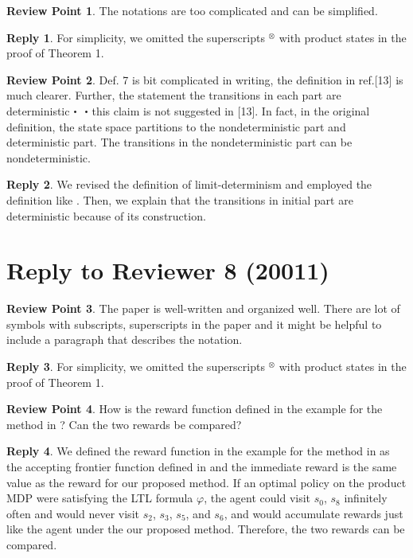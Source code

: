 \documentclass[10 pt, dvipdfmx]{article}
\theoremstyle{definition}
\newtheorem{review point}{Review Point}[section]
\newtheorem*{reply}{Reply}
\begin{document}
\begin{review point}
  The notations are too complicated and can be simplified.
\end{review point}

\begin{reply}
  For simplicity, we omitted the superscripts $^{\otimes}$ with product states in the proof of Theorem 1.
\end{reply}

\begin{review point}
  Def. 7 is bit complicated in writing, the definition in ref.[13] is
much clearer. Further, the statement the transitions in each part are
deterministic・・this claim is not suggested in [13]. In fact, in the
original definition, the state space partitions to the nondeterministic
part and deterministic part. The transitions in the nondeterministic
part can be nondeterministic.
\end{review point}

\begin{reply}
  We revised the definition of limit-determinism and employed the definition like \cite{SEJK2016}. Then, we explain that the transitions in initial part are deterministic because of its construction.
\end{reply}

\section{Reply to Reviewer 8 (20011)}

\begin{review point}
  The paper is well-written and organized well. There are lot of
symbols with subscripts, superscripts in the paper and it might be
helpful to include a paragraph that describes the notation.
\end{review point}

\begin{reply}
  For simplicity, we omitted the superscripts $^{\otimes}$ with product states in the proof of Theorem 1.
\end{reply}

\begin{review point}
  How is the reward function defined in the example for the method in
\cite{HAK2019}? Can the two rewards be compared?
\end{review point}

\begin{reply}
  We defined the reward function in the example for the method in \cite{HAK2019} as the accepting frontier function defined in \cite{HAK2019} and the immediate reward is the same value as the reward for our proposed method. If an optimal policy on the product MDP were satisfying the LTL formula $\varphi$, the agent could visit $s_0$, $s_8$ infinitely often and would never visit $s_2$, $s_3$, $s_5$, and $s_6$, and would accumulate rewards just like the agent under the our proposed method. Therefore, the two rewards can be compared.
\end{reply}
\end{document}
